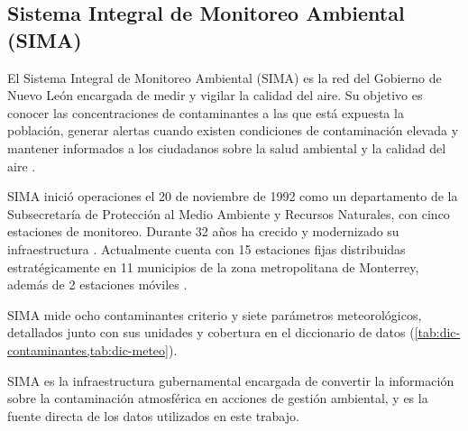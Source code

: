 \subsection{Sistema Integral de Monitoreo Ambiental (SIMA)}
\label{sec:sima}

El Sistema Integral de Monitoreo Ambiental (SIMA) es la red del Gobierno de
Nuevo León encargada de medir y vigilar la calidad del aire. Su objetivo es
conocer las concentraciones de contaminantes a las que está expuesta la
población, generar alertas cuando existen condiciones de contaminación elevada
y mantener informados a los ciudadanos sobre la salud ambiental y la calidad del
aire \parencite{gobiernoNL2026PIGECA}.

SIMA inició operaciones el 20 de noviembre de 1992 como un departamento de la
Subsecretaría de Protección al Medio Ambiente y Recursos Naturales, con
cinco estaciones de monitoreo. Durante 32 años ha crecido y modernizado
su infraestructura \parencite{villasaez2024}. Actualmente cuenta con 15
estaciones fijas distribuidas estratégicamente en 11 municipios de la zona
metropolitana de Monterrey, además de 2 estaciones móviles
\parencite{gobiernoNL2026ModernizacionSIMA}.

SIMA mide ocho contaminantes criterio y siete parámetros meteorológicos,
detallados junto con sus unidades y cobertura en el diccionario de datos
(\cref{tab:dic-contaminantes,tab:dic-meteo}).

SIMA es la infraestructura gubernamental encargada de convertir la información
sobre la contaminación atmosférica en acciones de gestión ambiental, y es la
fuente directa de los datos utilizados en este trabajo.
